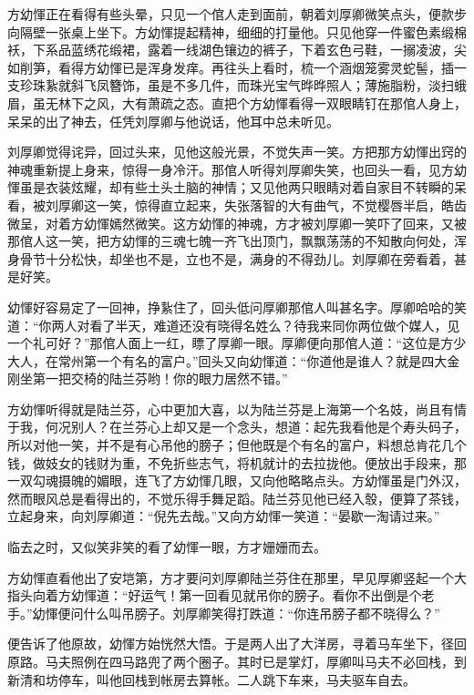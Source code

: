 \documentclass[12pt,UTF8]{ctexbook}
\begin{document}
{{{方幼惲正在看得有些头晕，只见一个倌人走到面前，朝着刘厚卿微笑点头，便款步向隔壁一张桌上坐下。方幼惲提起精神，细细的打量他。只见他穿一件蜜色素缎棉袄，下系品蓝绣花缎裙，露着一线湖色镶边的裤子，下着玄色弓鞋，一搦凌波，尖如削笋，看得方幼惲已是浑身发痒。再往头上看时，梳一个涵烟笼雾灵蛇髻，插一支珍珠紥就斜飞凤簪饰，虽是不多几件，而珠光宝气晔晔照人；薄施脂粉，淡扫蛾眉，虽无林下之风，大有萧疏之态。直把个方幼惲看得一双眼睛钉在那倌人身上，呆呆的出了神去，任凭刘厚卿与他说话，他耳中总未听见。

刘厚卿觉得诧异，回过头来，见他这般光景，不觉失声一笑。方把那方幼惲出窍的神魂重新提上身来，惊得一身冷汗。那倌人听得刘厚卿失笑，也回头一看，见方幼惲虽是衣装炫耀，却有些土头土脑的神情；又见他两只眼睛对着自家目不转瞬的呆看，被刘厚卿这一笑，惊得直立起来，失张落智的大有曲气，不觉樱唇半启，皓齿微呈，对着方幼惲嫣然微笑。这方幼惲的神魂，方才被刘厚卿一笑吓了回来，又被那倌人这一笑，把方幼惲的三魂七魄一齐飞出顶门，飘飘荡荡的不知散向何处，浑身骨节十分松快，却坐也不是，立也不是，满身的不得劲儿。刘厚卿在旁看着，甚是好笑。

幼惲好容易定了一回神，挣紥住了，回头低问厚卿那倌人叫甚名字。厚卿哈哈的笑道：“你两人对看了半天，难道还没有晓得名姓么？待我来同你两位做个媒人，见一个礼可好？”那倌人面上一红，瞟了厚卿一眼。厚卿便向那倌人道：“这位是方少大人，在常州第一个有名的富户。”回头又向幼惲道：“你道他是谁人？就是四大金刚坐第一把交椅的陆兰芬哟！你的眼力居然不错。”

方幼惲听得就是陆兰芬，心中更加大喜，以为陆兰芬是上海第一个名妓，尚且有情于我，何况别人？在兰芬心上却又是一个念头，想道：起先我看他是个寿头码子，所以对他一笑，并不是有心吊他的膀子；但他既是个有名的富户，料想总肯花几个钱，做妓女的钱财为重，不免折些志气，将机就计的去拉拢他。便放出手段来，那一双勾魂摄魄的媚眼，连飞了方幼惲几眼，又向他略略点头。方幼惲虽是门外汉，然而眼风总是看得出的，不觉乐得手舞足蹈。陆兰芬见他已经入彀，便算了茶钱，立起身来，向刘厚卿道：“倪先去哉。”又向方幼惲一笑道：“晏歇一淘请过来。”

临去之时，又似笑非笑的看了幼惲一眼，方才姗姗而去。

方幼惲直看他出了安垲第，方才要问刘厚卿陆兰芬住在那里，早见厚卿竖起一个大指头向着方幼惲道：“好运气！第一回看见就吊你的膀子。看你不出倒是个老手。”幼惲便问什么叫吊膀子。刘厚卿笑得打跌道：“你连吊膀子都不晓得么？”

便告诉了他原故，幼惲方始恍然大悟。于是两人出了大洋房，寻着马车坐下，径回原路。马夫照例在四马路兜了两个圈子。其时已是掌灯，厚卿叫马夫不必回栈，到新清和坊停车，叫他回栈到帐房去算帐。二人跳下车来，马夫驱车自去。

}}}
\end{document}
